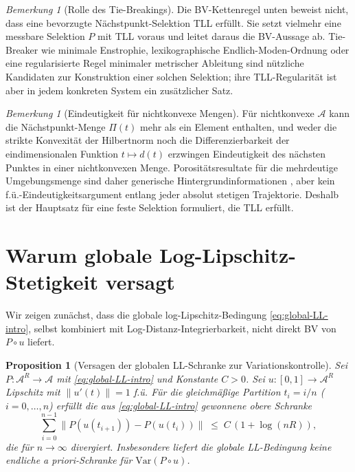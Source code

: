 \documentclass[12pt,a4paper]{article}
\theoremstyle{definition}
\theoremstyle{plain}
\newtheorem{proposition}[definition]{Proposition}
\theoremstyle{remark}
\newtheorem{remark}[definition]{Bemerkung}
\newcommand{\Var}{\mathrm{Var}}
\begin{document}
\begin{remark}[Rolle des Tie-Breakings]
Die BV-Kettenregel unten beweist nicht, dass eine bevorzugte
Nächstpunkt-Selektion TLL erfüllt.  Sie setzt vielmehr eine messbare
Selektion $P$ mit TLL voraus und leitet daraus die BV-Aussage ab.
Tie-Breaker wie minimale Enstrophie, lexikographische
Endlich-Moden-Ordnung oder eine regularisierte
Regel minimaler metrischer Ableitung sind nützliche Kandidaten zur Konstruktion
einer solchen Selektion; ihre TLL-Regularität ist aber in jedem
konkreten System ein zusätzlicher Satz.
\end{remark}

\begin{remark}[Eindeutigkeit für nichtkonvexe Mengen]\label{rem:uniqueness-caveat}
Für nichtkonvexe $\mathcal{A}$ kann die Nächstpunkt-Menge
$\Pi(t)$ mehr als ein Element enthalten, und weder die strikte
Konvexität der Hilbertnorm noch die Differenzierbarkeit der
eindimensionalen Funktion $t\mapsto d(t)$ erzwingen Eindeutigkeit
des nächsten Punktes in einer nichtkonvexen Menge.  Porositätsresultate
für die mehrdeutige Umgebungsmenge sind daher generische
Hintergrundinformationen
\cite{Zamfirescu1990,DeBlasiMyjak1993}, aber kein
f.ü.-Eindeutigkeitsargument entlang jeder absolut stetigen
Trajektorie.  Deshalb ist der
Hauptsatz für eine feste Selektion formuliert, die TLL erfüllt.
\end{remark}


\section{Warum globale Log-Lipschitz-Stetigkeit versagt}
\label{sec:counterexample}

Wir zeigen zunächst, dass die globale log-Lipschitz-Bedingung
\eqref{eq:global-LL-intro}, selbst kombiniert mit
Log-Distanz-Integrierbarkeit, nicht direkt BV von $P \circ u$ liefert.

\begin{proposition}[Versagen der globalen LL-Schranke zur Variationskontrolle]
\label{prop:divergence}
Sei $P: \mathcal{A}^R \to \mathcal{A}$ mit
\eqref{eq:global-LL-intro} und Konstante $C > 0$.  Sei
$u: [0,1] \to \mathcal{A}^R$ Lipschitz mit
$\|u'(t)\| = 1$ f.ü.  Für die gleichmäßige Partition
$t_i = i/n$ ($i = 0, \ldots, n$) erfüllt die aus
\eqref{eq:global-LL-intro} gewonnene obere Schranke
\[
  \sum_{i=0}^{n-1} \|P(u(t_{i+1})) - P(u(t_i))\|
  \;\le\;
  C\,(1 + \log(nR)),
\]
die für $n \to \infty$ divergiert.  Insbesondere liefert die
globale LL-Bedingung keine endliche \emph{a priori}-Schranke
für $\Var(P \circ u)$.
\end{proposition}
\end{document}
